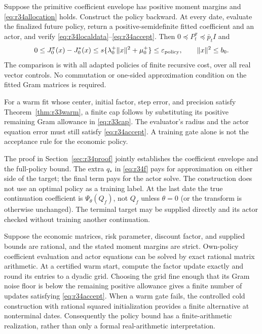 \begin{theorem}
\label{thm:r34robust}
Suppose the primitive coefficient envelope has positive moment margins and
\eqref{eq:r34allocation} holds. Construct the policy backward. At every date,
evaluate the finalized future policy, return a positive-semidefinite fitted
coefficient and an actor, and verify \eqref{eq:r34localdata}--\eqref{eq:r34accept}.
Then $0\preceq P_t^\pi\preceq\bar p_tI$ and
\begin{equation}\label{eq:r34policybound}
 0\leq J_0^\pi(x)-J_0^*(x)
 \leq s\{\lambda_0^+\|x\|^2+\mu_0^+\}
 \leq\varepsilon_{\rm policy},\qquad \|x\|^2\leq b_0.
\end{equation}
The comparison is with all adapted policies of finite recursive cost, over
all real vector controls. No commutation or one-sided approximation condition
on the fitted Gram matrices is required.

For a warm fit whose center, initial factor, step error, and precision satisfy
Theorem~\ref{thm:r33warm}, a finite cap follows by substituting its positive
remaining Gram allowance in \eqref{eq:r33cap}. The evaluator's radius and the
actor equation error must still satisfy \eqref{eq:r34accept}. A training gate
alone is not the acceptance rule for the economic policy.
\end{theorem}

The proof in Section~\ref{sec:r34proof} jointly establishes the coefficient
envelope and the full-policy bound. The extra $q_*$ in \eqref{eq:r34f} pays
for approximation on either side of the target; the final term pays for the
actor solve. The construction does not use an optimal policy as a training
label. At the last date the true continuation coefficient is
$\Psi_\theta(Q_f)$, not $Q_f$ unless $\theta=0$ (or the transform is otherwise
unchanged). The terminal target may be supplied directly and its actor
checked without training another continuation.

\begin{corollary}\label{cor:r34finite}
Suppose the economic matrices, risk parameter, discount factor, and supplied
bounds are rational, and the stated moment margins are strict. Own-policy
coefficient evaluation and actor equations can be solved by exact rational
matrix arithmetic. At a certified warm start, compute the factor update
exactly and round its entries to a dyadic grid. Choosing the grid fine enough
that its Gram noise floor is below the remaining positive allowance gives a
finite number of updates satisfying \eqref{eq:r34accept}. When a warm gate
fails, the controlled cold construction with rational squared initialization
provides a finite alternative at nonterminal dates. Consequently the policy
bound has a finite-arithmetic realization, rather than only a formal
real-arithmetic interpretation.
\end{corollary}

